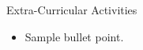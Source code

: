 \documentclass{resume} %
\begin{document}
\begin{rSection}{Extra-Curricular Activities} 
\begin{itemize}
    \item	Sample bullet point.
\end{itemize}


\end{rSection}



\end{document}
